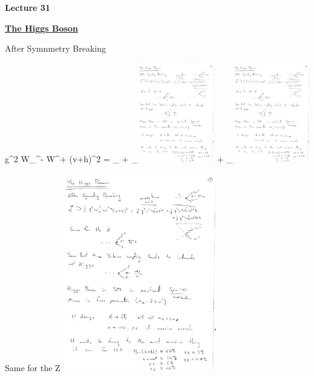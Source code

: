 
\usepackage{braket}
\usepackage{bbm}
\usepackage{relsize}
\usepackage{tcolorbox}




\usepackage{fancyhdr}
\usepackage{ dsfont }


\fancyhf{}


\thispagestyle{fancy}

\begin{center}
{\huge \textbf{Lecture 31}}
\end{center}

{\fontsize{14}{16}\selectfont


\textbf{\underline{The Higgs Boson}}

After Symnmetry Breaking 

\be
{} \subset {} g^2 W_\mu^- W^{+\mu} (v+h)^2 = _{}  + _{\includegraphics[width=0.25\textwidth]{./hWW.pdf}}  + _{\includegraphics[width=0.25\textwidth]{./hhWW.pdf}}
\ee

Same for the Z
\bc
\includegraphics[width=0.5\textwidth]{./hZZ.pdf}
\ec

}
